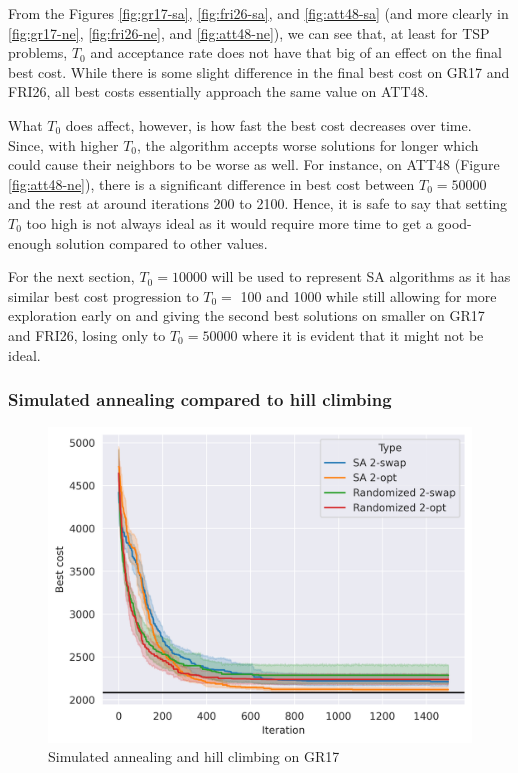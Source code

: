 From the Figures \ref{fig:gr17-sa}, \ref{fig:fri26-sa}, and \ref{fig:att48-sa} (and more clearly in \ref{fig:gr17-ne}, \ref{fig:fri26-ne}, and \ref{fig:att48-ne}), we can see that, at least for TSP problems, \(T_0\) and acceptance rate does not have that big of an effect on the final best cost. While there is some slight difference in the final best cost on GR17 and FRI26, all best costs essentially approach the same value on ATT48.

What \(T_0\) does affect, however, is how fast the best cost decreases over time. Since, with higher \(T_0\), the algorithm accepts worse solutions for longer which could cause their neighbors to be worse as well. For instance, on ATT48 (Figure \ref{fig:att48-ne}), there is a significant difference in best cost between \(T_0=50000\) and the rest at around iterations 200 to 2100. Hence, it is safe to say that setting \(T_0\) too high is not always ideal as it would require more time to get a good-enough solution compared to other values.

For the next section, \(T_0=10000\) will be used to represent SA algorithms as it has similar best cost progression to \(T_0=\) 100 and 1000 while still allowing for more exploration early on and giving the second best solutions on smaller on GR17 and FRI26, losing only to \(T_0=50000\) where it is evident that it might not be ideal.

\subsubsection*{Simulated annealing compared to hill climbing}

\begin{figure}
    \centering
    \includegraphics[]{images/gr17-with-hc.png}
    \caption{Simulated annealing and hill climbing on GR17}
    \label{fig:gr17}
\end{figure}

